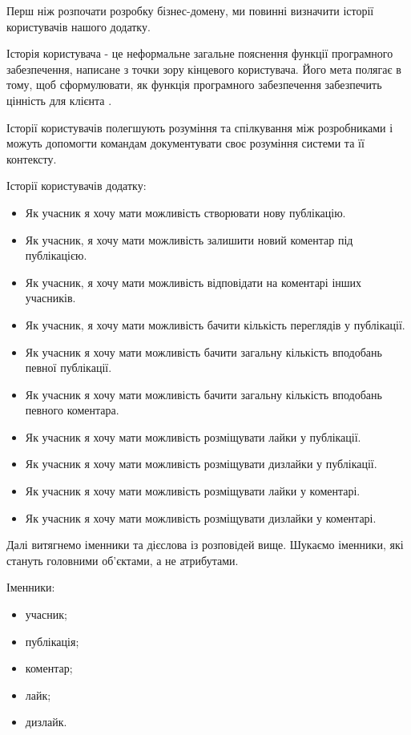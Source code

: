 Перш ніж розпочати розробку бізнес-домену, ми повинні визначити
історії користувачів нашого додатку.

Історія користувача - це неформальне загальне пояснення функції
програмного забезпечення, написане з точки зору кінцевого користувача.
Його мета полягає в тому, щоб сформулювати, як функція програмного
забезпечення забезпечить цінність для клієнта \cite{user-story-article}.

Історії користувачів полегшують розуміння та спілкування між розробниками і можуть допомогти командам
документувати своє розуміння системи та її контексту.

Історії користувачів додатку:
\begin{itemize}
		\item Як учасник я хочу мати можливість створювати нову публікацію.
		\item Як учасник, я хочу мати можливість залишити новий коментар під публікацією.
		\item Як учасник, я хочу мати можливість відповідати на коментарі інших учасників.
		\item Як учасник, я хочу мати можливість бачити кількість переглядів у публікації.
		\item Як учасник я хочу мати можливість бачити загальну кількість вподобань певної публікації.
		\item Як учасник я хочу мати можливість бачити загальну кількість вподобань певного коментара.
		\item Як учасник я хочу мати можливість розміщувати лайки у публікації.
		\item Як учасник я хочу мати можливість розміщувати дизлайки у публікації.
		\item Як учасник я хочу мати можливість розміщувати лайки у коментарі.
		\item Як учасник я хочу мати можливість розміщувати дизлайки у коментарі.
\end{itemize}

Далі витягнемо іменники та дієслова із розповідей вище.
Шукаємо іменники, які стануть головними об'єктами, а не атрибутами.

Іменники:
\begin{itemize}
		\item учасник;
		\item публікація;
		\item коментар;
		\item лайк;
		\item дизлайк.
\end{itemize}

